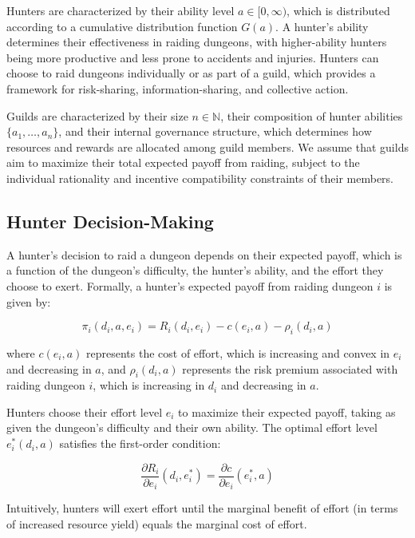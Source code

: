 \documentclass[12pt, a4paper]{article}
\begin{document}
Hunters are characterized by their ability level $a \in [0,\infty)$, which is distributed according to a cumulative distribution function $G(a)$. A hunter's ability determines their effectiveness in raiding dungeons, with higher-ability hunters being more productive and less prone to accidents and injuries. Hunters can choose to raid dungeons individually or as part of a guild, which provides a framework for risk-sharing, information-sharing, and collective action.

Guilds are characterized by their size $n \in \mathbb{N}$, their composition of hunter abilities $\{a_1, \ldots, a_n\}$, and their internal governance structure, which determines how resources and rewards are allocated among guild members. We assume that guilds aim to maximize their total expected payoff from raiding, subject to the individual rationality and incentive compatibility constraints of their members.

\subsection{Hunter Decision-Making}
A hunter's decision to raid a dungeon depends on their expected payoff, which is a function of the dungeon's difficulty, the hunter's ability, and the effort they choose to exert. Formally, a hunter's expected payoff from raiding dungeon $i$ is given by:

\begin{equation}
\pi_i(d_i, a, e_i) = R_i(d_i, e_i) - c(e_i, a) - \rho_i(d_i, a)
\end{equation}

where $c(e_i, a)$ represents the cost of effort, which is increasing and convex in $e_i$ and decreasing in $a$, and $\rho_i(d_i, a)$ represents the risk premium associated with raiding dungeon $i$, which is increasing in $d_i$ and decreasing in $a$.

Hunters choose their effort level $e_i$ to maximize their expected payoff, taking as given the dungeon's difficulty and their own ability. The optimal effort level $e_i^*(d_i, a)$ satisfies the first-order condition:

\begin{equation}
\frac{\partial R_i}{\partial e_i}(d_i, e_i^*) = \frac{\partial c}{\partial e_i}(e_i^*, a)
\end{equation}

Intuitively, hunters will exert effort until the marginal benefit of effort (in terms of increased resource yield) equals the marginal cost of effort.
\end{document}
